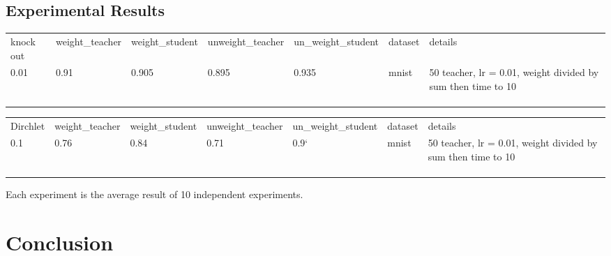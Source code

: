 \documentclass{article}
\theoremstyle{definition}
\begin{document}
\subsection{Experimental Results}
\begin{table}[t]
\begin{tabular}{lllllll}
knock out              & weight\_teacher & weight\_student & unweight\_teacher & un\_weight\_student & dataset & details                                                      \\
 0.01 & 0.91            & 0.905           & 0.895             & 0.935               & mnist   & 50 teacher, lr = 0.01, weight divided by sum then time to 10 \\
                    &                 &                 &                   &                     &         &                                                              \\
                    &                 &                 &                   &                     &         &                                                              \\
                    &                 &                 &                   &                     &         &                                                             
\end{tabular}
\end{table}
\begin{table}[]
\begin{tabular}{lllllll}
Dirchlet           & weight\_teacher & weight\_student & unweight\_teacher & un\_weight\_student & dataset & details                                                      \\
 0.1 & 0.76           & 0.84           & 0.71          & 0.9`             & mnist   & 50 teacher, lr = 0.01, weight divided by sum then time to 10 \\
                    &                 &                 &                   &                     &         &                                                              \\
                    &                 &                 &                   &                     &         &                                                              \\
                    &                 &                 &                   &                     &         &                                                             
\end{tabular}
\end{table}
Each experiment is the average result of 10 independent experiments.

\section{Conclusion}



\end{document}
